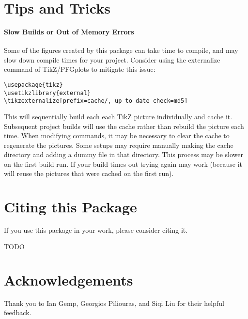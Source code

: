 \documentclass[10pt]{article}
\begin{document}
\section{Tips and Tricks}

\paragraph{Slow Builds or Out of Memory Errors}

Some of the figures created by this package can take time to compile, and may slow down compile times for your project. Consider using the externalize command of TikZ/PFGplots to mitigate this issue:

\begin{verbatim}
\usepackage{tikz}
\usetikzlibrary{external}
\tikzexternalize[prefix=cache/, up to date check=md5]
\end{verbatim}

This will sequentially build each each TikZ picture individually and cache it. Subsequent project builds will use the cache rather than rebuild the picture each time. When modifying commands, it may be necessary to clear the cache to regenerate the pictures. Some setups may require manually making the cache directory and adding a dummy file in that directory. This process may be slower on the first build run. If your build times out trying again may work (because it will reuse the pictures that were cached on the first run).


\section{Citing this Package}

If you use this package in your work, please consider citing it.

TODO

\section{Acknowledgements}

Thank you to Ian Gemp, Georgios Piliouras, and Siqi Liu for their helpful feedback.



\end{document}
